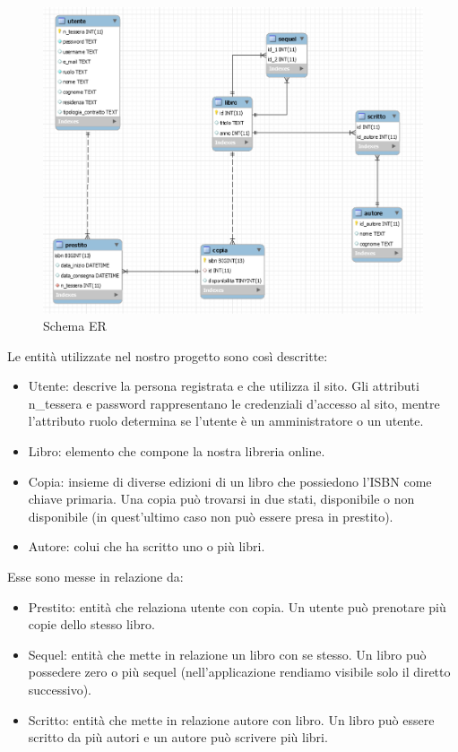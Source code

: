 \documentclass[a4paper,10pt]{article}
\begin{document}
\begin{figure}[H]
	\centering
	\includegraphics[width=0.9\linewidth]{images/ERdiagram}
	\caption[Schema ER]{Schema ER}
	\label{fig:re}
\end{figure}

Le entità utilizzate nel nostro progetto sono così descritte:

\begin{itemize}
	\item Utente: descrive la persona registrata e che utilizza il sito. Gli attributi n\_tessera e password rappresentano le credenziali d'accesso al sito, mentre l'attributo ruolo determina se l'utente è un amministratore o un utente.
	\item Libro: elemento che compone la nostra libreria online.
	\item Copia: insieme di diverse edizioni di un libro che possiedono l'ISBN come chiave primaria. Una copia può trovarsi in due stati, disponibile o non disponibile (in quest'ultimo caso non può essere presa in prestito).
	\item Autore: colui che ha scritto uno o più libri.
\end{itemize}

Esse sono messe in relazione da:
\begin{itemize}
	\item Prestito: entità che relaziona utente con copia. Un utente può prenotare più copie dello stesso libro.
	\item Sequel: entità che mette in relazione un libro con se stesso. Un libro può possedere zero o più sequel (nell'applicazione rendiamo visibile solo il diretto successivo).
	\item Scritto: entità che mette in relazione autore con libro. Un libro può essere scritto da più autori e un autore può scrivere più libri.
\end{itemize}
\end{document}
